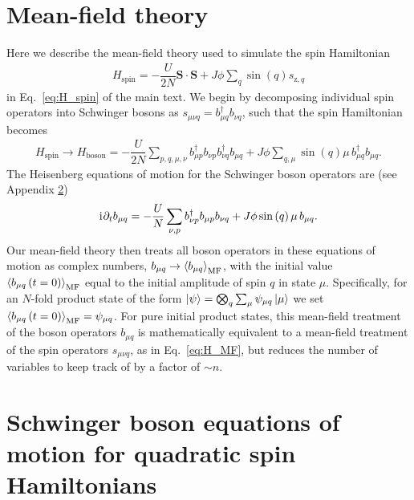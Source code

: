 \documentclass[nofootinbib,twocolumn]{revtex4-2}
\renewcommand{\t}{\text} %
\newcommand{\f}[2]{\dfrac{#1}{#2}} %
\newcommand{\p}[1]{\left(#1\right)} %
\newcommand{\bk}{\Braket} %
\renewcommand{\v}{\bm} %
\renewcommand{\c}{\cdot} %
\renewcommand{\i}{\mathrm{i}\mkern1mu} %
\newcommand{\1}{\mathds{1}}
\newcommand{\z}{\text{z}}
\newcommand{\MF}{\text{MF}}
\begin{document}
\section{Mean-field theory}
\label{sec:MFT}

Here we describe the mean-field theory used to simulate the spin Hamiltonian
\begin{align}
  H_{\t{spin}} = -\f{U}{2N}\v S\c\v S + J\phi \sum_q \sin\p{q} s_{\z,q}
\end{align}
in Eq.~\eqref{eq:H_spin} of the main text.
We begin by decomposing individual spin operators into Schwinger bosons as $s_{\mu\nu q} = b_{\mu q}^\dag b_{\nu q}$, such that the spin Hamiltonian becomes
\begin{align}
  H_{\t{spin}} \to H_{\t{boson}}
  = -\f{U}{2N} \sum_{p,q,\mu,\nu}
  b_{\mu p}^\dag b_{\nu p} b_{\nu q}^\dag b_{\mu q}
  + J\phi \sum_{q,\mu} \sin\p{q} \mu\, b_{\mu q}^\dag b_{\mu q}.
\end{align}
The Heisenberg equations of motion for the Schwinger boson operators are (see Appendix \ref{sec:bosons})
\begin{align}
  \i \partial_t b_{\mu q}
  = -\f{U}{N} \sum_{\nu,p} b_{\nu p}^\dag b_{\mu p} b_{\nu q}
  + J\phi \sin\p{q} \mu\, b_{\mu q}.
\end{align}
Our mean-field theory then treats all boson operators in these equations of motion as complex numbers, $b_{\mu q}\to\bk{b_{\mu q}}_\MF$, with the initial value $\bk{b_{\mu q}\p{t=0}}_\MF$ equal to the initial amplitude of spin $q$ in state $\mu$.
Specifically, for an $N$-fold product state of the form $\ket\psi=\bigotimes_q\sum_\mu\psi_{\mu q}\ket{\mu}$ we set $\bk{b_{\mu q}\p{t=0}}_\MF = \psi_{\mu q}$.
For pure initial product states, this mean-field treatment of the boson operators $b_{\mu q}$ is mathematically equivalent to a mean-field treatment of the spin operators $s_{\mu\nu q}$, as in Eq.~\eqref{eq:H_MF}, but reduces the number of variables to keep track of by a factor of $\sim n$.

\section{Schwinger boson equations of motion for quadratic spin Hamiltonians}
\label{sec:bosons}
\end{document}
